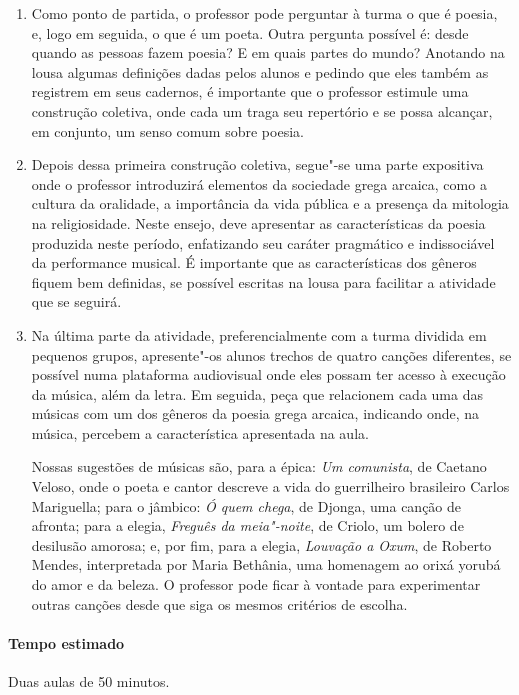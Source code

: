 \documentclass[12pt]{extarticle}
\begin{document}
\begin{enumerate}
\item
Como ponto de partida, o professor pode perguntar à turma o que é poesia,
e, logo em seguida, o que é um poeta. Outra pergunta possível é: desde quando
as pessoas fazem poesia? E em quais partes do mundo? 
Anotando na lousa algumas definições dadas pelos alunos e pedindo que eles
também as registrem em seus cadernos, é importante que o professor estimule 
uma construção coletiva, onde cada um traga seu repertório e se possa alcançar,
em conjunto, um senso comum sobre poesia.

\item
Depois dessa primeira construção coletiva, segue"-se uma parte expositiva onde 
o professor introduzirá elementos da sociedade grega arcaica, como a cultura
da oralidade, a importância da vida pública e a presença da mitologia na religiosidade. 
Neste ensejo, deve apresentar as características da poesia produzida neste período, 
enfatizando seu caráter pragmático e indissociável da performance musical.
É importante que as características dos gêneros fiquem bem definidas, se possível
escritas na lousa para facilitar a atividade que se seguirá. 

\item
Na última parte da atividade, preferencialmente com a turma dividida em pequenos 
grupos, apresente"-os alunos trechos de quatro canções diferentes, se possível numa 
plataforma audiovisual onde eles possam ter acesso à execução da música, além da letra. 
Em seguida, peça que relacionem cada uma das músicas com um dos gêneros da poesia grega 
arcaica, indicando onde, na música, percebem a característica apresentada na aula. 

Nossas sugestões de músicas são, para a épica: \emph{Um comunista}, de Caetano Veloso, 
onde o poeta e cantor descreve a vida do guerrilheiro brasileiro Carlos Mariguella;
para o jâmbico: \emph{Ó quem chega}, de Djonga, uma canção de afronta; para a elegia, 
\emph{Freguês da meia"-noite}, de Criolo, um bolero de desilusão amorosa; e, por fim,
para a elegia, \emph{Louvação a Oxum}, de Roberto Mendes, interpretada por Maria Bethânia,
uma homenagem ao orixá yorubá do amor e da beleza.
O professor pode ficar à vontade para experimentar outras canções desde que siga os
mesmos critérios de escolha.  
\end{enumerate}

\paragraph{Tempo estimado} Duas aulas de 50 minutos. 
\end{document}
